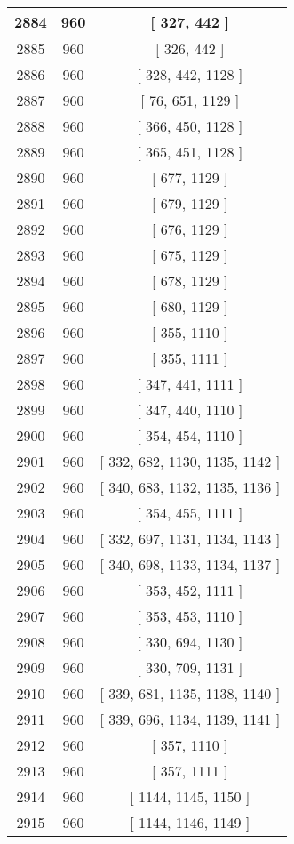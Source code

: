 \begin{center}
\begin{longtable}[H]{|| c c c ||}
\hline
2884 & 960 & [ 327, 442 ] \\ 
\hline
2885 & 960 & [ 326, 442 ] \\ 
\hline
2886 & 960 & [ 328, 442, 1128 ] \\ 
\hline
2887 & 960 & [ 76, 651, 1129 ] \\ 
\hline
2888 & 960 & [ 366, 450, 1128 ] \\ 
\hline
2889 & 960 & [ 365, 451, 1128 ] \\ 
\hline
2890 & 960 & [ 677, 1129 ] \\ 
\hline
2891 & 960 & [ 679, 1129 ] \\ 
\hline
2892 & 960 & [ 676, 1129 ] \\ 
\hline
2893 & 960 & [ 675, 1129 ] \\ 
\hline
2894 & 960 & [ 678, 1129 ] \\ 
\hline
2895 & 960 & [ 680, 1129 ] \\ 
\hline
2896 & 960 & [ 355, 1110 ] \\ 
\hline
2897 & 960 & [ 355, 1111 ] \\ 
\hline
2898 & 960 & [ 347, 441, 1111 ] \\ 
\hline
2899 & 960 & [ 347, 440, 1110 ] \\ 
\hline
2900 & 960 & [ 354, 454, 1110 ] \\ 
\hline
2901 & 960 & [ 332, 682, 1130, 1135, 1142 ] \\ 
\hline
2902 & 960 & [ 340, 683, 1132, 1135, 1136 ] \\ 
\hline
2903 & 960 & [ 354, 455, 1111 ] \\ 
\hline
2904 & 960 & [ 332, 697, 1131, 1134, 1143 ] \\ 
\hline
2905 & 960 & [ 340, 698, 1133, 1134, 1137 ] \\ 
\hline
2906 & 960 & [ 353, 452, 1111 ] \\ 
\hline
2907 & 960 & [ 353, 453, 1110 ] \\ 
\hline
2908 & 960 & [ 330, 694, 1130 ] \\ 
\hline
2909 & 960 & [ 330, 709, 1131 ] \\ 
\hline
2910 & 960 & [ 339, 681, 1135, 1138, 1140 ] \\ 
\hline
2911 & 960 & [ 339, 696, 1134, 1139, 1141 ] \\ 
\hline
2912 & 960 & [ 357, 1110 ] \\ 
\hline
2913 & 960 & [ 357, 1111 ] \\ 
\hline
2914 & 960 & [ 1144, 1145, 1150 ] \\ 
\hline
2915 & 960 & [ 1144, 1146, 1149 ] \\ 

\end{longtable}
\end{center}

